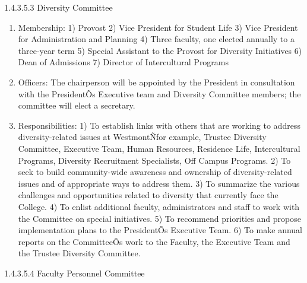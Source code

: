 \documentclass[letterpaper, 11pt]{article}
\begin{document}
				1.4.3.5.3 Diversity Committee
				\begin{enumerate}[label=\alph*)]
					\item{Membership:}
					1) Provost
					2) Vice President for Student Life
					3) Vice President for Administration and Planning
					4) Three faculty, one elected annually to a three-year term
					5) Special Assistant to the Provost for Diversity Initiatives
					6) Dean of Admissions
					7) Director of Intercultural Programs

					\item{Officers:}
					The chairperson will be appointed by the President in consultation with the PresidentÕs Executive team and Diversity Committee members; the committee will elect a secretary.
					\item{Responsibilities:}
					1) To establish links with others that are working to address diversity-related issues at WestmontÑfor example, Trustee Diversity Committee, Executive Team, Human Resources, Residence Life, Intercultural Programs, Diversity Recruitment Specialists, Off Campus Programs.
					2) To seek to build community-wide awareness and ownership of diversity-related issues and of appropriate ways to address them.
					3) To summarize the various challenges and opportunities related to diversity that currently face the College.
					4) To enlist additional faculty, administrators and staff to work with the Committee on special initiatives.
					5) To recommend priorities and propose implementation plans to the PresidentÕs Executive Team.
					6) To make annual reports on the CommitteeÕs work to the Faculty, the Executive Team and the Trustee Diversity Committee.
				\end{enumerate}
				1.4.3.5.4 Faculty Personnel Committee
\end{document}
